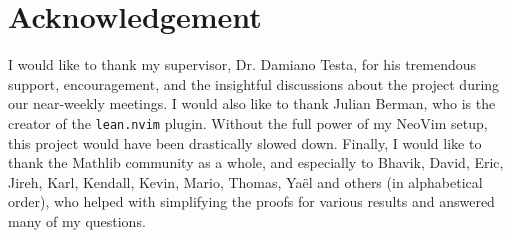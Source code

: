 \section{Acknowledgement}

I would like to thank my supervisor, Dr. Damiano Testa, for his tremendous support, encouragement, and the insightful discussions about the project during our near-weekly meetings. I would also like to thank Julian Berman, who is the creator of the \texttt{lean.nvim} plugin. Without the full power of my NeoVim setup, this project would have been drastically slowed down. Finally, I would like to thank the Mathlib community as a whole, and especially to Bhavik, David, Eric, Jireh, Karl, Kendall, Kevin, Mario, Thomas, Yaël and others (in alphabetical order), who helped with simplifying the proofs for various results and answered many of my questions.
